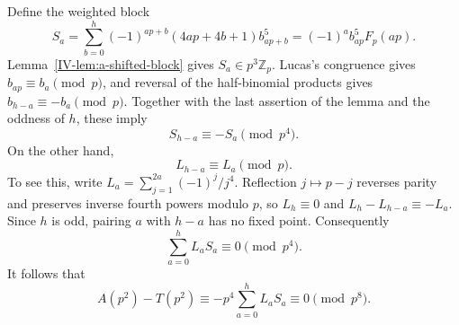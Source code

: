 \documentclass[11pt,letterpaper]{article}
\numberwithin{equation}{section}
\begin{document}
Define the weighted block
\[
 S_a=\sum_{b=0}^{h}(-1)^{ap+b}(4ap+4b+1)b_{ap+b}^5
     =(-1)^a b_{ap}^5F_p(ap).
\]
Lemma~\ref{IV-lem:a-shifted-block} gives $S_a\in p^3\mathbb Z_p$.
Lucas's congruence gives $b_{ap}\equiv b_a\pmod p$, and reversal
of the half-binomial products gives $b_{h-a}\equiv-b_a\pmod p$.
Together with the last assertion of the lemma and the oddness of
$h$, these imply
\[
 S_{h-a}\equiv-S_a\pmod{p^4}.
\]
On the other hand,
\[
 L_{h-a}\equiv L_a\pmod p.
\]
To see this, write $L_a=\sum_{j=1}^{2a}(-1)^j/j^4$.
Reflection $j\mapsto p-j$ reverses parity and preserves inverse
fourth powers modulo $p$, so $L_h\equiv0$ and
$L_h-L_{h-a}\equiv-L_a$. Since $h$ is odd, pairing $a$ with
$h-a$ has no fixed point. Consequently
\[
 \sum_{a=0}^{h}L_aS_a\equiv0\pmod{p^4}.
\]
It follows that
\begin{equation}\label{IV-eq:a-r2-delete}
 A(p^2)-T(p^2)\equiv-p^4\sum_{a=0}^{h}L_aS_a
                  \equiv0\pmod{p^8}.
\end{equation}
\end{document}
